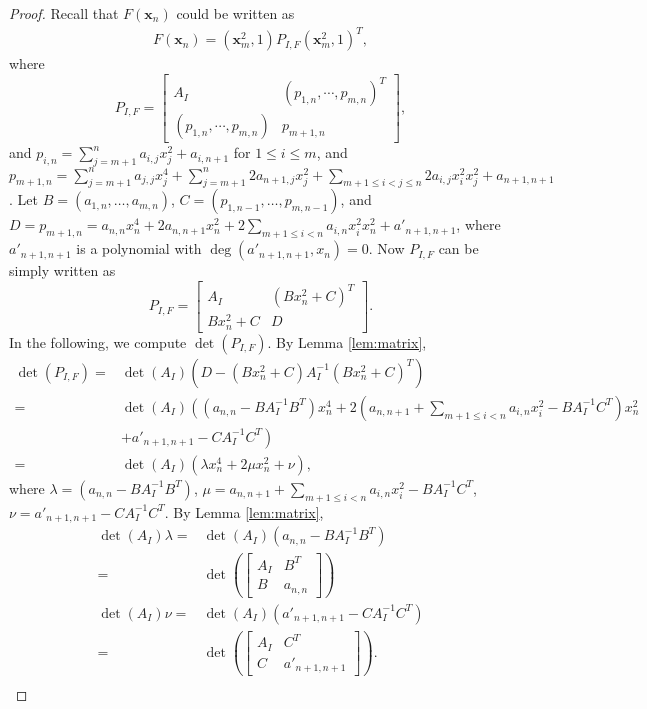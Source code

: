 \documentclass[amsthm]{elsart}
\newcommand{\xx}{\bm{x}}
\begin{document}
\begin{proof}
Recall that
$F(\xx_n)$ could be written as
        \begin{align*}
                F(\xx_n)=(\xx_m^2,1)P_{I,F}(\xx_m^2,1)^T,
        \end{align*}
where
 $$P_{I,F}=\begin{bmatrix} A_{I} & (p_{1,n}, \cdots , p_{m,n})^T \\ (p_{1,n}, \cdots , p_{m,n}) & p_{m+1,n} \end{bmatrix},$$
  and $p_{i,n}=\sum_{j=m+1}^na_{i,j}x_j^2+a_{i,n+1}$ for $1\le i\le m$, and $p_{m+1,n}=\sum_{j=m+1}^n a_{j,j}x_j^4+\sum_{j=m+1}^n 2a_{n+1,j}x_j^2+\sum_{m+1\le i<j\le n} 2a_{i,j}x_i^2x_j^2+a_{n+1,n+1}$.
  Let $B=(a_{1,n},\ldots,a_{m,n})$, $C=(p_{1,n-1},\ldots,p_{m,n-1})$, and $D=p_{m+1,n}=a_{n,n}x_n^4+2a_{n,n+1}x_n^2+2\sum_{m+1\le i< n} a_{i,n}x_i^2x_n^2+a'_{n+1,n+1}$,
  where $a'_{n+1,n+1}$ is a polynomial with $\deg(a'_{n+1,n+1},x_n)=0$.
Now $P_{I,F}$ can be simply written as
  $$P_{I,F}=\begin{bmatrix} A_{I} & (Bx_n^2+C)^T \\ Bx_n^2+C & D \end{bmatrix}.$$
  In the following, we compute $\det(P_{I,F})$. By Lemma \ref{lem:matrix},
   \begin{align*}
    \det(P_{I,F})=&\det(A_{I})(D-(Bx_n^2+C)A_I^{-1}(Bx_n^2+C)^T)\\
    =&\det(A_{I})\left((a_{n,n}-BA_I^{-1}B^T)x_n^4+\right.2(a_{n,n+1}+\sum_{m+1\le i< n} a_{i,n}x_i^2-BA_I^{-1}C^T)x_n^2\\
    & \left. +a'_{n+1,n+1}-CA_I^{-1}C^T\right)\\
    =&\det(A_I)(\lambda x_n^4+2\mu x_n^2+\nu),
  \end{align*}
  where $\lambda=(a_{n,n}-BA_I^{-1}B^T)$, $\mu=a_{n,n+1}+\sum_{m+1\le i< n} a_{i,n}x_i^2-BA_I^{-1}C^T$, $\nu=a'_{n+1,n+1}-CA_I^{-1}C^T$.
  By Lemma \ref{lem:matrix},
  \begin{align*}
    \det(A_I)\lambda=&\det(A_I)(a_{n,n}-BA_I^{-1}B^T)\\
    =&\det\left(\begin{bmatrix} A_I&B^T\\
        B&a_{n,n}\end{bmatrix}\right) \\
\det(A_I)\nu=&\det(A_I)(a'_{n+1,n+1}-CA_I^{-1}C^T)\\
    =&\det\left(\begin{bmatrix} A_I&C^T\\
        C&a'_{n+1,n+1}\end{bmatrix}\right).\\

\end{align*}
\end{proof}
\end{document}
